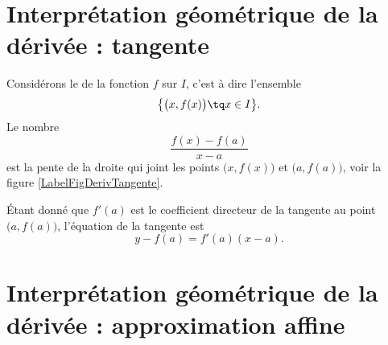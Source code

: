 \section[Interprétation géométrique : tangente]{Interprétation géométrique de la dérivée : tangente}

Considérons le  de la fonction $f$ sur $I$, c'est à dire l'ensemble
\begin{equation}
	\big\{ \big( x,f(x) \big)\tq x\in I \big\}.
\end{equation}
Le nombre 
\begin{equation}
	\frac{ f(x)-f(a) }{ x-a }
\end{equation}
est la pente de la droite qui joint les points $\big( x,f(x) \big)$ et $\big( a,f(a) \big)$, voir la figure \ref{LabelFigDerivTangente}.
\newcommand{\CaptionFigDerivTangente}{Le coefficient directeur de la corde entre $a$ et $x$.}


Étant donné que $f'(a)$ est le coefficient directeur de la tangente au point $\big( a,f(a) \big)$, l'équation de la tangente est
\begin{equation}		\label{EqTgfaenOM}
	y-f(a)=f'(a)(x-a).
\end{equation}

\section[Interprétation géométrique : approximation affine]{Interprétation géométrique de la dérivée : approximation affine}

